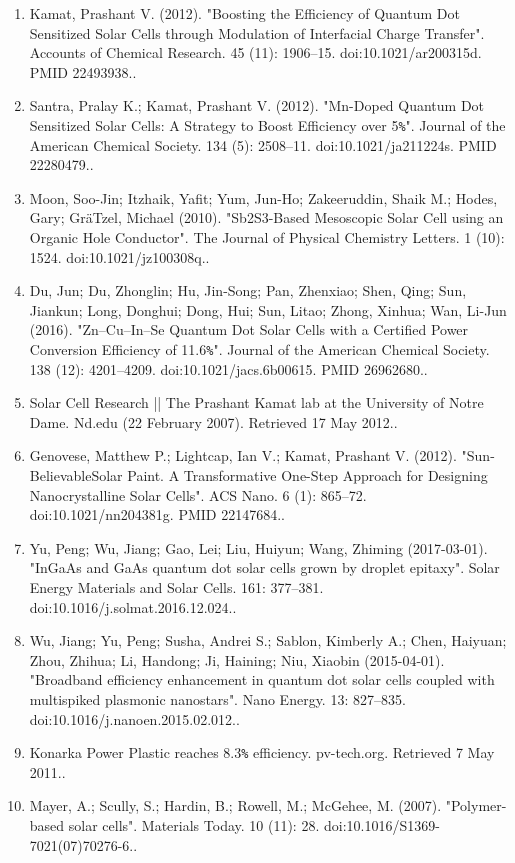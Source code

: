 \begin{enumerate}
\item Kamat, Prashant V. (2012). "Boosting the Efficiency of Quantum Dot Sensitized Solar Cells through Modulation of Interfacial Charge Transfer". Accounts of Chemical Research. 45 (11): 1906–15. doi:10.1021/ar200315d. PMID 22493938..
\item Santra, Pralay K.; Kamat, Prashant V. (2012). "Mn-Doped Quantum Dot Sensitized Solar Cells: A Strategy to Boost Efficiency over 5\verb|%|". Journal of the American Chemical Society. 134 (5): 2508–11. doi:10.1021/ja211224s. PMID 22280479..
\item Moon, Soo-Jin; Itzhaik, Yafit; Yum, Jun-Ho; Zakeeruddin, Shaik M.; Hodes, Gary; GräTzel, Michael (2010). "Sb2S3-Based Mesoscopic Solar Cell using an Organic Hole Conductor". The Journal of Physical Chemistry Letters. 1 (10): 1524. doi:10.1021/jz100308q..
\item Du, Jun; Du, Zhonglin; Hu, Jin-Song; Pan, Zhenxiao; Shen, Qing; Sun, Jiankun; Long, Donghui; Dong, Hui; Sun, Litao; Zhong, Xinhua; Wan, Li-Jun (2016). "Zn–Cu–In–Se Quantum Dot Solar Cells with a Certified Power Conversion Efficiency of 11.6\verb|%|". Journal of the American Chemical Society. 138 (12): 4201–4209. doi:10.1021/jacs.6b00615. PMID 26962680..
\item Solar Cell Research || The Prashant Kamat lab at the University of Notre Dame. Nd.edu (22 February 2007). Retrieved 17 May 2012..
\item Genovese, Matthew P.; Lightcap, Ian V.; Kamat, Prashant V. (2012). "Sun-BelievableSolar Paint. A Transformative One-Step Approach for Designing Nanocrystalline Solar Cells". ACS Nano. 6 (1): 865–72. doi:10.1021/nn204381g. PMID 22147684..
\item Yu, Peng; Wu, Jiang; Gao, Lei; Liu, Huiyun; Wang, Zhiming (2017-03-01). "InGaAs and GaAs quantum dot solar cells grown by droplet epitaxy". Solar Energy Materials and Solar Cells. 161: 377–381. doi:10.1016/j.solmat.2016.12.024..
\item Wu, Jiang; Yu, Peng; Susha, Andrei S.; Sablon, Kimberly A.; Chen, Haiyuan; Zhou, Zhihua; Li, Handong; Ji, Haining; Niu, Xiaobin (2015-04-01). "Broadband efficiency enhancement in quantum dot solar cells coupled with multispiked plasmonic nanostars". Nano Energy. 13: 827–835. doi:10.1016/j.nanoen.2015.02.012..
\item Konarka Power Plastic reaches 8.3\verb|%| efficiency. pv-tech.org. Retrieved 7 May 2011..
\item Mayer, A.; Scully, S.; Hardin, B.; Rowell, M.; McGehee, M. (2007). "Polymer-based solar cells". Materials Today. 10 (11): 28. doi:10.1016/S1369-7021(07)70276-6..

\end{enumerate}
